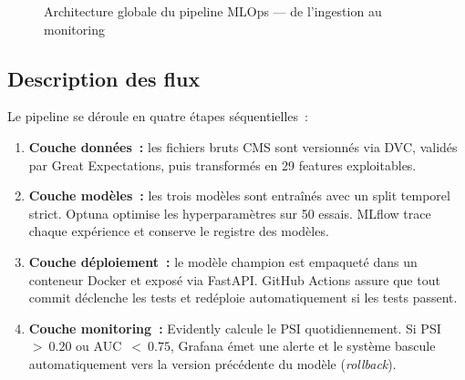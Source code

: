 \begin{figure}[htbp]
\caption{Architecture globale du pipeline MLOps --- de l'ingestion au monitoring}
\label{fig:pipeline_mlops}
\end{figure}

\subsection{Description des flux}

Le pipeline se déroule en quatre étapes séquentielles~:

\begin{enumerate}
  \item \textbf{Couche données~:} les fichiers bruts CMS sont versionnés via DVC,
        validés par Great Expectations, puis transformés en 29 features exploitables.
  \item \textbf{Couche modèles~:} les trois modèles sont entraînés avec un split
        temporel strict. Optuna optimise les hyperparamètres sur 50 essais. MLflow
        trace chaque expérience et conserve le registre des modèles.
  \item \textbf{Couche déploiement~:} le modèle champion est empaqueté dans un
        conteneur Docker et exposé via FastAPI. GitHub Actions assure que tout
        commit déclenche les tests et redéploie automatiquement si les tests passent.
  \item \textbf{Couche monitoring~:} Evidently calcule le PSI quotidiennement.
        Si PSI~$>~0.20$ ou AUC~$<~0.75$, Grafana émet une alerte et le système
        bascule automatiquement vers la version précédente du modèle (\textit{rollback}).
\end{enumerate}

